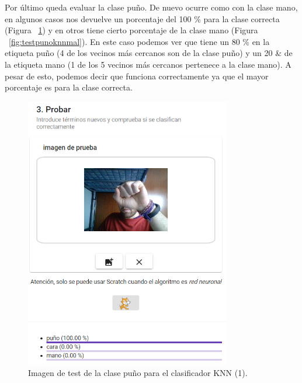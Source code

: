 \documentclass[a4paper, 12pt]{book}
\begin{document}
Por último queda evaluar la clase puño. De nuevo ocurre como con la clase mano, en algunos casos nos devuelve un porcentaje del 100 \% para la clase correcta (Figura ~\ref{fig:testpunoknnbien}) y en otros tiene cierto porcentaje de la clase mano (Figura ~\ref{fig:testpunoknnmal}). En este caso podemos ver que tiene un 80 \% en la etiqueta puño (4 de los vecinos más cercanos son de la clase puño) y un 20 \& de la etiqueta mano (1 de los 5 vecinos más cercanos pertenece a la clase mano). A pesar de esto, podemos decir que funciona correctamente ya que el mayor porcentaje es para la clase correcta.

\begin{figure}
	\centering
	\includegraphics[width=9cm, keepaspectratio]{img/testpunoknnbien}
	\caption{Imagen de test de la clase puño para el clasificador KNN (1).}			
	\label{fig:testpunoknnbien}
\end{figure}
\end{document}
